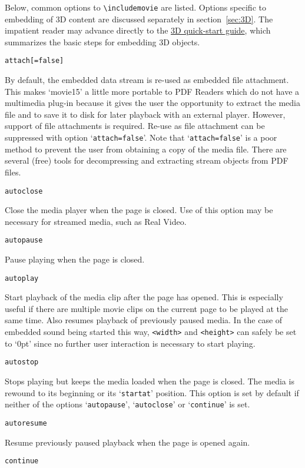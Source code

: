 \documentclass[a4paper]{article}
\begin{document}
Below, common options to \verb+\includemovie+ are listed. Options specific to embedding of 3D content are discussed separately in section~\ref{sec:3D}. The impatient reader may advance directly to the \hyperlink{sec:3Dtut}{3D quick-start guide}, which summarizes the basic steps for embedding 3D objects.
\begin{verbatim}
attach[=false]
\end{verbatim}
By default, the embedded data stream is re-used as embedded file attachment. This makes `movie15' a little more portable to PDF Readers which do not have a multimedia plug-in because it gives the user the opportunity to extract the media file and to save it to disk for later playback with an external player. However, support of file attachments is required. Re-use as file attachment can be suppressed with option `\verb+attach=false+'. Note that `\verb+attach=false+' is a poor method to prevent the user from obtaining a copy of the media file. There are several (free) tools for decompressing and extracting stream objects from PDF files.
\begin{verbatim}
autoclose
\end{verbatim}
Close the media player when the page is closed. Use of this option may be necessary for streamed media, such as Real Video.
\begin{verbatim}
autopause
\end{verbatim}
Pause playing when the page is closed.
\begin{verbatim}
autoplay
\end{verbatim}
Start playback of the media clip after the page has opened. This is especially useful if there are multiple movie clips on the current page to be played at the same time. Also resumes playback of previously paused media. In the case of embedded sound being started this way, \verb+<width>+ and \verb+<height>+ can safely be set to `0pt' since no further user interaction is necessary to start playing.
\begin{verbatim}
autostop
\end{verbatim}
Stops playing but keeps the media loaded when the page is closed. The media is rewound to its beginning or its `\verb+startat+' position. This option is set by default if neither of the options `\verb+autopause+', `\verb+autoclose+' or `\verb+continue+' is set.
\begin{verbatim}
autoresume
\end{verbatim}
Resume previously paused playback when the page is opened again.
\begin{verbatim}
continue
\end{verbatim}
\end{document}
